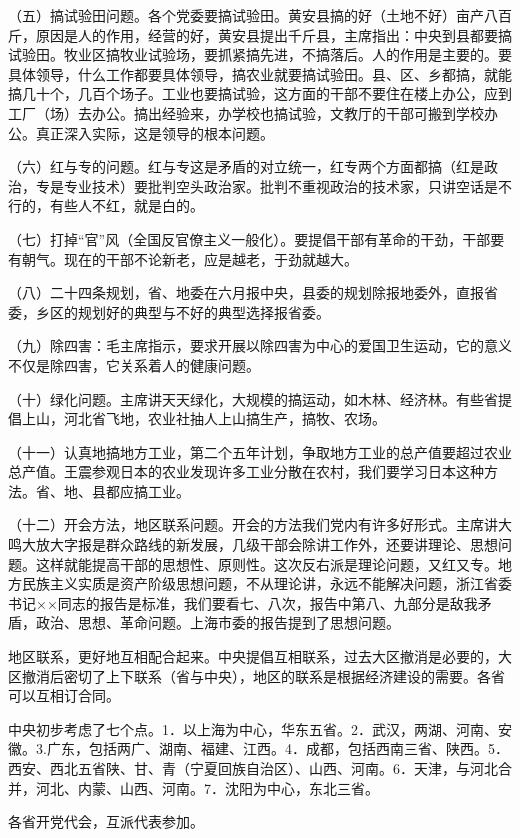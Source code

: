 （五）搞试验田问题。各个党委要搞试验田。黄安县搞的好（土地不好）亩产八百斤，原因是人的作用，经营的好，黄安县提出千斤县，主席指出：中央到县都要搞试验田。牧业区搞牧业试验场，要抓紧搞先进，不搞落后。人的作用是主要的。要具体领导，什么工作都要具体领导，搞农业就要搞试验田。县、区、乡都搞，就能搞几十个，几百个场子。工业也要搞试验，这方面的干部不要住在楼上办公，应到工厂（场）去办公。搞出经验来，办学校也搞试验，文教厅的干部可搬到学校办公。真正深入实际，这是领导的根本问题。

（六）红与专的问题。红与专这是矛盾的对立统一，红专两个方面都搞（红是政治，专是专业技术）要批判空头政治家。批判不重视政治的技术家，只讲空话是不行的，有些人不红，就是白的。

（七）打掉“官”风（全国反官僚主义一般化）。要提倡干部有革命的干劲，干部要有朝气。现在的干部不论新老，应是越老，于劲就越大。

（八）二十四条规划，省、地委在六月报中央，县委的规划除报地委外，直报省委，乡区的规划好的典型与不好的典型选择报省委。

（九）除四害：毛主席指示，要求开展以除四害为中心的爱国卫生运动，它的意义不仅是除四害，它关系着人的健康问题。

（十）绿化问题。主席讲天天绿化，大规模的搞运动，如木林、经济林。有些省提倡上山，河北省飞地，农业社抽人上山搞生产，搞牧、农场。

（十一）认真地搞地方工业，第二个五年计划，争取地方工业的总产值要超过农业总产值。王震参观日本的农业发现许多工业分散在农村，我们要学习日本这种方法。省、地、县都应搞工业。

（十二）开会方法，地区联系问题。开会的方法我们党内有许多好形式。主席讲大鸣大放大字报是群众路线的新发展，几级干部会除讲工作外，还要讲理论、思想问题。这样就能提高干部的思想性、原则性。这次反右派是理论问题，又红又专。地方民族主义实质是资产阶级思想问题，不从理论讲，永远不能解决问题，浙江省委书记××同志的报告是标准，我们要看七、八次，报告中第八、九部分是敌我矛盾，政治、思想、革命问题。上海市委的报告提到了思想问题。

地区联系，更好地互相配合起来。中央提倡互相联系，过去大区撤消是必要的，大区撤消后密切了上下联系（省与中央），地区的联系是根据经济建设的需要。各省可以互相订合同。

中央初步考虑了七个点。1．以上海为中心，华东五省。2．武汉，两湖、河南、安徽。3.广东，包括两广、湖南、福建、江西。4．成都，包括西南三省、陕西。5．西安、西北五省陕、甘、青（宁夏回族自治区）、山西、河南。6．天津，与河北合并，河北、内蒙、山西、河南。7．沈阳为中心，东北三省。

各省开党代会，互派代表参加。

